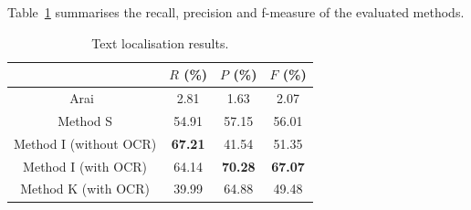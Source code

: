 Table~\ref{tab:text_results} summarises the recall, precision and f-measure of the evaluated methods.

  \begin{table}[ht]
    \normalsize
    \centering
    \caption{Text localisation results.}
    \begin{tabular}{|c|c|c|c|}
          \hline
          &  $R$ (\%)  & $P$ (\%)  & $F$ (\%)  \\
          \hline
          Arai~\cite{Arai11}  & 2.81    & 1.63      & 2.07       \\
          \hline
          Method S            & 54.91   & 57.15     & 56.01       \\
          \hline
          Method I (without OCR)  & \textbf{67.21}   & 41.54    & 51.35       \\
          \hline
          Method I (with OCR)  & 64.14   & \textbf{70.28}    & \textbf{67.07}       \\
          \hline
          Method K (with OCR)  & 39.99   & 64.88    & 49.48       \\
          \hline
        \end{tabular}
    \label{tab:text_results}
  \end{table}%


